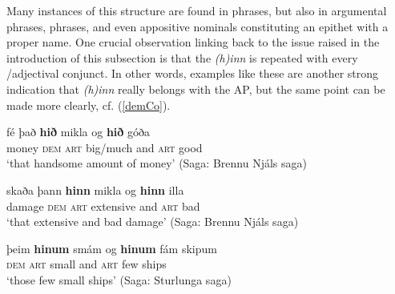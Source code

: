 \documentclass[output=paper,colorlinks,citecolor=brown]{langscibook}
\begin{document}
Many instances of this structure are found in   phrases, but also in argumental  phrases,   phrases, and even  appositive nominals constituting an epithet with a proper name.  One crucial observation linking back to the issue raised in the introduction of this subsection is that  the  \textit{(h)inn}  is repeated with every /adjectival conjunct.  %
In other words, examples like these are another strong  indication  that \textit{(h)inn} really belongs with the AP, but the same point can be made more clearly, cf. (\ref{demCo}).

\begin{exe}
\ex \label{demCo}   
    \begin{xlist}
        \ex \gll fé það \textbf{hið} mikla og \textbf{hið}  góða \\
         money \textsc{dem} \textsc{art} big/much and \textsc{art} good \\
         \glt `that handsome amount of money'   (Saga: Brennu Njáls saga) 
         
        \ex\gll    skaða  þann \textbf{hinn}  mikla og \textbf{hinn} illa \\ 
         damage \textsc{dem} \textsc{art} extensive and \textsc{art} bad  \\ 
         \glt `that extensive and bad damage'   (Saga: Brennu Njáls saga)  
         
        \ex \label{demCoc} \gll   þeim  \textbf{hinum}  smám og \textbf{hinum}  fám skipum \\ 
         \textsc{dem} \textsc{art} small and \textsc{art} few ships  \\
         \glt `those few small ships'   (Saga: Sturlunga saga)  
         
\end{xlist} 
\end{exe} 
\end{document}

